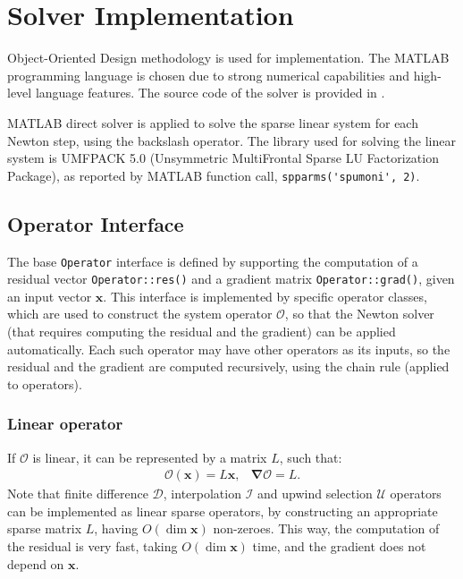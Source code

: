 \documentclass[MSc,beforeExam]{iitcsthesis}
\newcommand\bnabla{\boldsymbol{\nabla}}
\newcommand\bx{\boldsymbol{x}}
\newcommand\cO{\mathcal{O}}
\newcommand\cI{\mathcal{I}}
\newcommand\cD{\mathcal{D}}
\begin{document}
\section{Solver Implementation}

Object-Oriented Design methodology is used for implementation.
The MATLAB programming language is chosen due to strong numerical capabilities
and high-level language features.
The source code of the solver is provided in \cite{source}.

MATLAB direct solver is applied to solve the sparse linear system for each Newton step,
using the backslash operator. 
The library used for solving the linear system is UMFPACK 5.0 \cite{davis2004umfpack}
(Unsymmetric MultiFrontal Sparse LU Factorization Package),
as reported by MATLAB function call, \verb|spparms('spumoni', 2)|. 

\subsection{Operator Interface} \label{sec:operator-interface}
The base \verb|Operator| interface is defined by 
supporting the computation of a residual vector \verb|Operator::res()|
and a gradient matrix \verb|Operator::grad()|, given an input vector $\bx$.
This interface is implemented by specific operator classes,
which are used to construct the system operator $\cO$, so that 
the Newton solver (that requires computing the residual and the gradient) 
can be applied automatically.
Each such operator may have other operators as its inputs, so the residual
and the gradient are computed recursively, using the chain rule (applied to operators).

\subsubsection{Linear operator}
If $\cO$ is linear, it can be represented by a matrix $L$, such that:
\begin{equation}\begin{array}{cc}
\cO(\bx) = L \bx, &
\bnabla\cO = L. 
\end{array}\end{equation}
Note that finite difference $\cD$, interpolation $\cI$ and 
upwind selection $\mathcal{U}$ operators
can be implemented as linear sparse operators, by constructing 
an appropriate sparse matrix $L$, having $O(\dim \bx)$ non-zeroes.
This way, the computation of the residual is very fast, taking $O(\dim \bx)$ time,
and the gradient does not depend on $\bx$.
\end{document}

